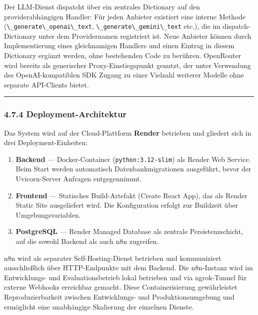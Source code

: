 Der LLM-Dienst dispatcht über ein zentrales Dictionary auf den
providerabhängigen Handler: Für jeden Anbieter existiert eine interne
Methode (\passthrough{\lstinline!\_generate\_openai\_text!},
\passthrough{\lstinline!\_generate\_gemini\_text!} etc.), die im
dispatch-Dictionary unter dem Providernamen registriert ist. Neue
Anbieter können durch Implementierung eines gleichnamigen Handlers und
einen Eintrag in diesem Dictionary ergänzt werden, ohne bestehenden Code
zu berühren. OpenRouter wird bereits als generischer
Proxy-Einstiegspunkt genutzt, der unter Verwendung des
OpenAI-kompatiblen SDK Zugang zu einer Vielzahl weiterer Modelle ohne
separate API-Clients bietet.

\begin{center}\rule{0.5\linewidth}{0.5pt}\end{center}

\subsubsection{4.7.4
Deployment-Architektur}\label{deployment-architektur}

Das System wird auf der Cloud-Plattform \textbf{Render} betrieben und
gliedert sich in drei Deployment-Einheiten:

\begin{enumerate}
\def\labelenumi{\arabic{enumi}.}
\tightlist
\item
  \textbf{Backend} --- Docker-Container
  (\passthrough{\lstinline!python:3.12-slim!}) als Render Web Service.
  Beim Start werden automatisch Datenbankmigrationen ausgeführt, bevor
  der Uvicorn-Server Anfragen entgegennimmt.
\item
  \textbf{Frontend} --- Statisches Build-Artefakt (Create React App),
  das als Render Static Site ausgeliefert wird. Die Konfiguration
  erfolgt zur Buildzeit über Umgebungsvariablen.
\item
  \textbf{PostgreSQL} --- Render Managed Database als zentrale
  Persistenzschicht, auf die sowohl Backend als auch n8n zugreifen.
\end{enumerate}

n8n wird als separater Self-Hosting-Dienst betrieben und kommuniziert
ausschließlich über HTTP-Endpunkte mit dem Backend. Die n8n-Instanz wird
im Entwicklungs- und Evaluationsbetrieb lokal betrieben und via
ngrok-Tunnel für externe Webhooks erreichbar gemacht. Diese
Containerisierung gewährleistet Reproduzierbarkeit zwischen
Entwicklungs- und Produktionsumgebung und ermöglicht eine unabhängige
Skalierung der einzelnen Dienste.

